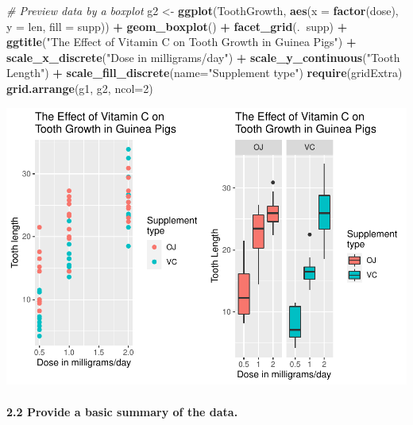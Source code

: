 \documentclass[
  landscape]{article}
\newenvironment{Shaded}{\begin{snugshade}}{\end{snugshade}}
\newcommand{\CommentTok}[1]{\textcolor[rgb]{0.56,0.35,0.01}{\textit{#1}}}
\newcommand{\DataTypeTok}[1]{\textcolor[rgb]{0.13,0.29,0.53}{#1}}
\newcommand{\DecValTok}[1]{\textcolor[rgb]{0.00,0.00,0.81}{#1}}
\newcommand{\KeywordTok}[1]{\textcolor[rgb]{0.13,0.29,0.53}{\textbf{#1}}}
\newcommand{\NormalTok}[1]{#1}
\newcommand{\OperatorTok}[1]{\textcolor[rgb]{0.81,0.36,0.00}{\textbf{#1}}}
\newcommand{\StringTok}[1]{\textcolor[rgb]{0.31,0.60,0.02}{#1}}
\begin{document}
\begin{Shaded}
\begin{Highlighting}[]
\CommentTok{# Preview data by a boxplot}
\NormalTok{g2 <-}\StringTok{ }\KeywordTok{ggplot}\NormalTok{(ToothGrowth, }\KeywordTok{aes}\NormalTok{(}\DataTypeTok{x =} \KeywordTok{factor}\NormalTok{(dose), }\DataTypeTok{y =}\NormalTok{ len, }\DataTypeTok{fill =}\NormalTok{ supp)) }\OperatorTok{+}
\StringTok{    }\KeywordTok{geom_boxplot}\NormalTok{() }\OperatorTok{+}
\StringTok{    }\KeywordTok{facet_grid}\NormalTok{(.}\OperatorTok{~}\NormalTok{supp) }\OperatorTok{+}
\StringTok{    }\KeywordTok{ggtitle}\NormalTok{(}\StringTok{"The Effect of Vitamin C on }
\StringTok{Tooth Growth in Guinea Pigs"}\NormalTok{) }\OperatorTok{+}
\StringTok{    }\KeywordTok{scale_x_discrete}\NormalTok{(}\StringTok{"Dose in milligrams/day"}\NormalTok{) }\OperatorTok{+}\StringTok{   }
\StringTok{    }\KeywordTok{scale_y_continuous}\NormalTok{(}\StringTok{"Tooth Length"}\NormalTok{) }\OperatorTok{+}\StringTok{  }
\StringTok{    }\KeywordTok{scale_fill_discrete}\NormalTok{(}\DataTypeTok{name=}\StringTok{"Supplement}
\StringTok{type"}\NormalTok{) }
\KeywordTok{require}\NormalTok{(gridExtra)}
\KeywordTok{grid.arrange}\NormalTok{(g1, g2, }\DataTypeTok{ncol=}\DecValTok{2}\NormalTok{)}
\end{Highlighting}
\end{Shaded}

\includegraphics{PA1_files/figure-latex/unnamed-chunk-4-1.pdf}

\hypertarget{provide-a-basic-summary-of-the-data.}{%
\paragraph{2.2 Provide a basic summary of the
data.}\label{provide-a-basic-summary-of-the-data.}}
\end{document}
